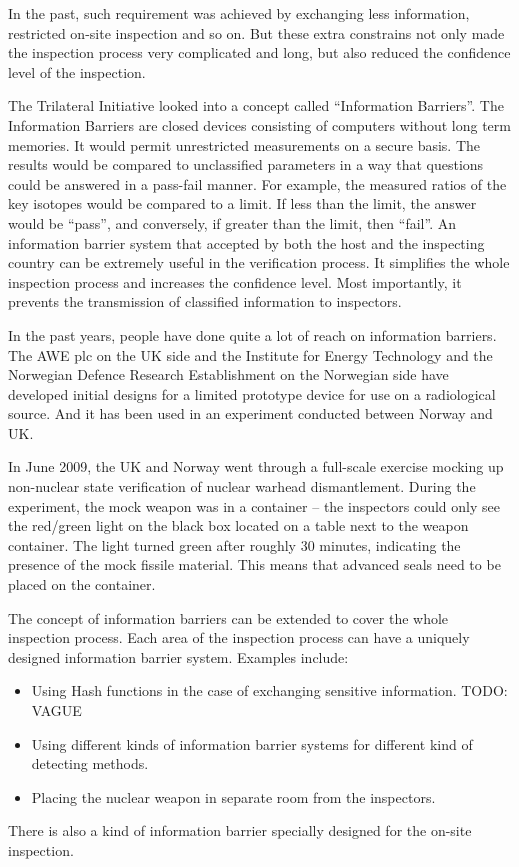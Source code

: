 \documentclass[twoside,titlepage,11pt,twocolumn,a4paper]{article}
\begin{document}
In the past, such requirement was achieved by exchanging less
information, restricted on-site inspection and so on. But these extra
constrains not only made the inspection process very complicated and
long, but also reduced the confidence level of the inspection.

The Trilateral Initiative looked into a concept called ``Information
Barriers''. The Information Barriers are closed devices consisting of
computers without long term memories. It would permit unrestricted
measurements on a secure basis. The results would be compared to
unclassified parameters in a way that questions could be answered in a
pass-fail manner. \citep{SUW2005} For example, the measured ratios of
the key isotopes would be compared to a limit. If less than the limit,
the answer would be ``pass'', and conversely, if greater than the
limit, then ``fail''. An information barrier system that accepted by
both the host and the inspecting country can be extremely useful in
the verification process. It simplifies the whole inspection process
and increases the confidence level. Most importantly, it prevents the
transmission of classified information to inspectors.


In the past years, people have done quite a lot of reach on
information barriers. The AWE plc on the UK side and the Institute for
Energy Technology and the Norwegian Defence Research Establishment on
the Norwegian side have developed initial designs for a limited
prototype device for use on a radiological source. And it has been
used in an experiment conducted between Norway and UK.

In June 2009, the UK and Norway went through a full-scale exercise
mocking up non-nuclear state verification of nuclear warhead
dismantlement.  During the experiment, the mock weapon was in a
container -- the inspectors could only see the red/green light on the
black box located on a table next to the weapon container. The light
turned green after roughly 30 minutes, indicating the presence of the
mock fissile material. This means that advanced seals need to be
placed on the container.

The concept of information barriers can be extended to cover the whole
inspection process. Each area of the inspection process can have a
uniquely designed information barrier system. Examples include:
\begin{itemize}
  \item Using Hash functions in the case of exchanging sensitive
    information. \citep{knuth1976} TODO: VAGUE
  \item Using different kinds of information barrier systems for
    different kind of detecting methods.
  \item Placing the nuclear weapon in separate room from the
    inspectors.
\end{itemize}
There is also a kind of information barrier specially
designed for the on-site inspection.
\end{document}

